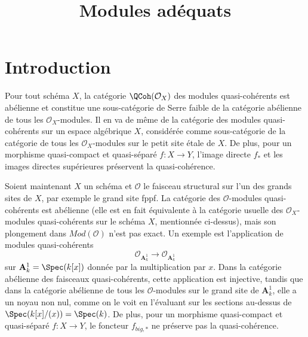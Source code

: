 

%


\title{Modules adéquats}


\maketitle

\label{section-phantom}

\tableofcontents

\section{Introduction}
\label{section-introduction}

\noindent
Pour tout schéma $X$, la catégorie $\QCoh(\mathcal{O}_X)$
des modules quasi-cohérents est abélienne et constitue une sous-catégorie
de Serre faible de la catégorie abélienne de tous les $\mathcal{O}_X$-modules.
Il en va de même de la catégorie des modules quasi-cohérents sur
un espace algébrique $X$, considérée comme sous-catégorie de la catégorie
de tous les $\mathcal{O}_X$-modules sur le petit site étale de $X$.
De plus, pour un morphisme quasi-compact et quasi-séparé
$f : X \to Y$, l'image directe $f_*$ et les images directes supérieures
préservent la quasi-cohérence.

\medskip\noindent
Soient maintenant $X$ un schéma et $\mathcal{O}$ le faisceau structural
sur l'un des grands sites de $X$, par exemple le grand site fppf.
La catégorie des $\mathcal{O}$-modules quasi-cohérents est abélienne
(elle est en fait équivalente à la catégorie usuelle des
$\mathcal{O}_X$-modules quasi-cohérents sur le schéma $X$, mentionnée ci-dessus),
mais son plongement dans $\textit{Mod}(\mathcal{O})$ n'est pas exact.
Un exemple est l'application de modules quasi-cohérents
$$
\mathcal{O}_{\mathbf{A}^1_k}
\longrightarrow
\mathcal{O}_{\mathbf{A}^1_k}
$$
sur $\mathbf{A}^1_k = \Spec(k[x])$ donnée par la multiplication par $x$.
Dans la catégorie abélienne des faisceaux quasi-cohérents, cette application
est injective, tandis que dans la catégorie abélienne de tous les
$\mathcal{O}$-modules sur le grand site de $\mathbf{A}^1_k$, elle a un noyau
non nul, comme on le voit en l'évaluant sur les sections au-dessus de
$\Spec(k[x]/(x)) = \Spec(k)$.
De plus, pour un morphisme quasi-compact et quasi-séparé
$f : X \to Y$, le foncteur $f_{big, *}$ ne préserve pas la quasi-cohérence.

